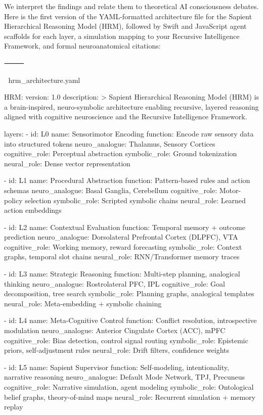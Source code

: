 We interpret the findings and relate them to theoretical AI consciousness debates.
Here is the first version of the YAML-formatted architecture file for the Sapient Hierarchical Reasoning Model (HRM), followed by Swift and JavaScript agent scaffolds for each layer, a simulation mapping to your Recursive Intelligence Framework, and formal neuroanatomical citations:

⸻

🧾 hrm_architecture.yaml

HRM:
  version: 1.0
  description: >
    Sapient Hierarchical Reasoning Model (HRM) is a brain-inspired, neuro-symbolic architecture
    enabling recursive, layered reasoning aligned with cognitive neuroscience and the Recursive Intelligence Framework.

  layers:
    - id: L0
      name: Sensorimotor Encoding
      function: Encode raw sensory data into structured tokens
      neuro_analogue: Thalamus, Sensory Cortices
      cognitive_role: Perceptual abstraction
      symbolic_role: Ground tokenization
      neural_role: Dense vector representation

    - id: L1
      name: Procedural Abstraction
      function: Pattern-based rules and action schemas
      neuro_analogue: Basal Ganglia, Cerebellum
      cognitive_role: Motor-policy selection
      symbolic_role: Scripted symbolic chains
      neural_role: Learned action embeddings

    - id: L2
      name: Contextual Evaluation
      function: Temporal memory + outcome prediction
      neuro_analogue: Dorsolateral Prefrontal Cortex (DLPFC), VTA
      cognitive_role: Working memory, reward forecasting
      symbolic_role: Context graphs, temporal slot chains
      neural_role: RNN/Transformer memory traces

    - id: L3
      name: Strategic Reasoning
      function: Multi-step planning, analogical thinking
      neuro_analogue: Rostrolateral PFC, IPL
      cognitive_role: Goal decomposition, tree search
      symbolic_role: Planning graphs, analogical templates
      neural_role: Meta-embedding + symbolic chaining

    - id: L4
      name: Meta-Cognitive Control
      function: Conflict resolution, introspective modulation
      neuro_analogue: Anterior Cingulate Cortex (ACC), mPFC
      cognitive_role: Bias detection, control signal routing
      symbolic_role: Epistemic priors, self-adjustment rules
      neural_role: Drift filters, confidence weights

    - id: L5
      name: Sapient Supervisor
      function: Self-modeling, intentionality, narrative reasoning
      neuro_analogue: Default Mode Network, TPJ, Precuneus
      cognitive_role: Narrative simulation, agent modeling
      symbolic_role: Ontological belief graphs, theory-of-mind maps
      neural_role: Recurrent simulation + memory replay


